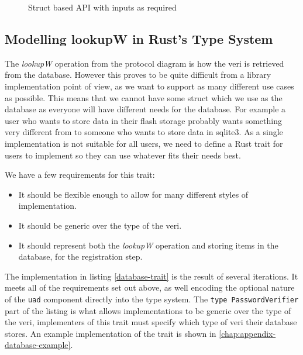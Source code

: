 \begin{figure}[H]

  \caption{Struct based API with inputs as required}
  \label{fig:actual-lib-structure}
\end{figure}

\subsection{Modelling lookupW in Rust’s Type System}
The \textit{lookupW} operation from the protocol diagram is how the \gls{veri} is retrieved from the database.
However this proves to be quite difficult from a library implementation point of view, as we want to support as many different use cases as possible.
This means that we cannot have some struct which we use as the database as everyone will have different needs for the database.
For example a user who wants to store data in their flash storage probably wants something very different from to someone who wants to store data in sqlite3.
As a single implementation is not suitable for all users, we need to define a Rust trait for users to implement so they can use whatever fits their needs best.

We have a few requirements for this trait:
\begin{itemize}
  \item{It should be flexible enough to allow for many different styles of implementation.}
  \item{It should be generic over the type of the \gls{veri}.}
  \item{It should represent both the \textit{lookupW} operation and storing items in the database, for the registration step.}
\end{itemize}


The implementation in listing \ref{database-trait} is the result of several iterations.
It meets all of the requirements set out above, as well encoding the optional nature of the \texttt{uad} component directly into the type system.
The \texttt{type PasswordVerifier} part of the listing is what allows implementations to be generic over the type of the \gls{veri}, implementers of this trait must specify which type of \gls{veri} their database stores.
An example implementation of the trait is shown in \cref{chap:appendix-database-example}.

